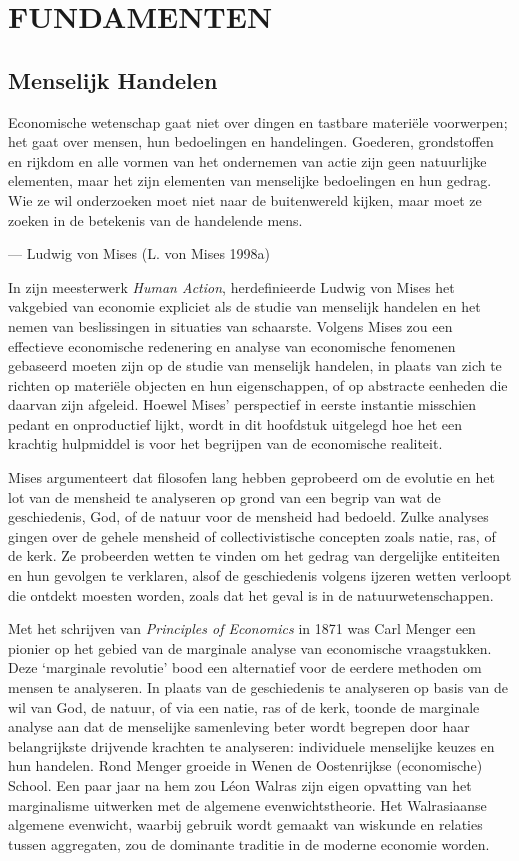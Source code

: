 \documentclass[
  a5paper,
  smalldemyvopaper,11pt,twoside,onecolumn,openright,extrafontsizes,
hidelinks]{memoir}
\begin{document}
\part{FUNDAMENTEN}

\chapter{Menselijk Handelen}\label{sec-menselijk-handelen}

Economische wetenschap gaat niet over dingen en tastbare materiële
voorwerpen; het gaat over mensen, hun bedoelingen en handelingen.
Goederen, grondstoffen en rijkdom en alle vormen van het ondernemen van
actie zijn geen natuurlijke elementen, maar het zijn elementen van
menselijke bedoelingen en hun gedrag. Wie ze wil onderzoeken moet niet
naar de buitenwereld kijken, maar moet ze zoeken in de betekenis van de
handelende mens.

--- Ludwig von Mises (L. von Mises 1998a)

In zijn meesterwerk \emph{Human Action}, herdefinieerde Ludwig von Mises
het vakgebied van economie expliciet als de studie van menselijk
handelen en het nemen van beslissingen in situaties van schaarste.
Volgens Mises zou een effectieve economische redenering en analyse van
economische fenomenen gebaseerd moeten zijn op de studie van menselijk
handelen, in plaats van zich te richten op materiële objecten en hun
eigenschappen, of op abstracte eenheden die daarvan zijn afgeleid.
Hoewel Mises' perspectief in eerste instantie misschien pedant en
onproductief lijkt, wordt in dit hoofdstuk uitgelegd hoe het een
krachtig hulpmiddel is voor het begrijpen van de economische realiteit.

Mises argumenteert dat filosofen lang hebben geprobeerd om de evolutie
en het lot van de mensheid te analyseren op grond van een begrip van wat
de geschiedenis, God, of de natuur voor de mensheid had bedoeld. Zulke
analyses gingen over de gehele mensheid of collectivistische concepten
zoals natie, ras, of de kerk. Ze probeerden wetten te vinden om het
gedrag van dergelijke entiteiten en hun gevolgen te verklaren, alsof de
geschiedenis volgens ijzeren wetten verloopt die ontdekt moesten worden,
zoals dat het geval is in de natuurwetenschappen.

Met het schrijven van \emph{Principles of Economics} in 1871 was Carl
Menger een pionier op het gebied van de marginale analyse van
economische vraagstukken. Deze `marginale revolutie' bood een
alternatief voor de eerdere methoden om mensen te analyseren. In plaats
van de geschiedenis te analyseren op basis van de wil van God, de
natuur, of via een natie, ras of de kerk, toonde de marginale analyse
aan dat de menselijke samenleving beter wordt begrepen door haar
belangrijkste drijvende krachten te analyseren: individuele menselijke
keuzes en hun handelen. Rond Menger groeide in Wenen de Oostenrijkse
(economische) School. Een paar jaar na hem zou Léon Walras zijn eigen
opvatting van het marginalisme uitwerken met de algemene
evenwichtstheorie. Het Walrasiaanse algemene evenwicht, waarbij gebruik
wordt gemaakt van wiskunde en relaties tussen aggregaten, zou de
dominante traditie in de moderne economie worden.
\end{document}
